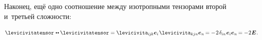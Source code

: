 \begin{otherlanguage}{russian}
\vspace{-0.3em}
Наконец, ещё одно соотношение между изотропными тензорами второй и~третьей сложности:

\nopagebreak\vspace{-0.2em}\begin{equation}
\levicivitatensor \hspace{.2ex} \dotdotp \levicivitatensor
= \levicivita_{i\hspace{-0.1ex}j\hspace{-0.1ex}k} \bm{e}_i \hspace{.2ex} \levicivita_{kjn} \bm{e}_n \hspace{-0.2ex}
= - \hspace{.2ex} 2 \hspace{.2ex} \delta_{in} \hspace{.12ex} \bm{e}_i \bm{e}_n \hspace{-0.2ex}
= - \hspace{.1ex} 2 \hspace{.1ex} \UnitDyad
\hspace{.1ex} .
\end{equation}

\end{otherlanguage}



\label{para:tensors.symmetric+skewsymmetric}

